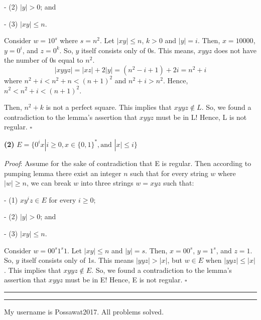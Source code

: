 \documentclass[a4paper, 11pt]{article}
\newcommand{\question}[2] {\vspace{.25in} \hrule\vspace{0.5em}
	\noindent{\bf #1: #2} \vspace{0.5em}
	\hrule \vspace{.10in}}
\renewcommand{\part}[1] {\vspace{.10in} {\bf (#1)}}
\begin{document}
	-	(2) $|y| > 0$; and
		
	-	(3) $|xy| \leq n$.
	
	Consider $w = 10^s$ where $s = n^2$. Let $|xy| \leq n$, $k > 0$ and $|y| = i$. Then, $x = 10000$, $y = 0^i$, and $z = 0^k$. So, $y$ itself consists only of 0s. This means, $xyyz$ does not have the number of 0s equal to $n^2$.
	$$|xyyz| = |xz| + 2|y| = (n^2 - i+1) + 2i = n^2 +i$$
	where $n^2 + i < n^2 + n < (n+1)^2$ and $n^2 + i > n^2$. Hence, $n^2 < n^2 + i < (n+1)^2$.
	
	Then, $n^2 + k$ is not a perfect square. This implies that $xyyz \notin L$. So, we found a contradiction to the lemma’s assertion that $xyyz$ must be in L! Hence, L is not regular. $\square$



	\part{2} $E = \{0^{i}x | i \geq 0, x \in \{0,1\}^*, \text{and } |x| \leq i\}$ %

	{\em Proof}: %
	Assume for the sake of contradiction that E is regular. Then according to pumping lemma there exist an integer $n$ such that for every string $w$ where $|w| \geq n$, we can break $w$ into three strings $w = xyz$ such that:
	
	-   (1) $xy^iz \in E$ for every $i \geq 0$;
	
	-	(2) $|y| > 0$; and
	
	-	(3) $|xy| \leq n$.
	
	Consider $w = 00^s1^s1$. Let $|xy| \leq n$ and $|y| = s$. Then, $x = 00^s$, $y = 1^s$, and $z = 1$. So, $y$ itself consists only of 1s. This means $|yyz| > |x|$, but $w \in E$ when $|yyz| \leq |x|$. This implies that $xyyz \notin E$. So, we found a contradiction to the lemma’s assertion that $xyyz$ must be in E! Hence, E is not regular. $\square$
	
	\question{4}{HackerRank Challenge} 
	
	My username is Possawat2017. All problems solved.
	
	
\end{document}
